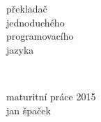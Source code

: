 \begin{titlingpage}
  \sffamily
  \begin{flushright}
    \fontsize{50}{60}\selectfont
    překladač\\
    jednoduchého\\
    programovacího\\
    jazyka
  \end{flushright}
  ~\\[15cm]
  \begin{flushleft}
    \fontsize{16}{19}\selectfont
    maturitní práce 2015\\
    \fontsize{20}{24}\selectfont
    jan špaček\\
  \end{flushleft}
\end{titlingpage}

\thispagestyle{empty}
\cleardoublepage

